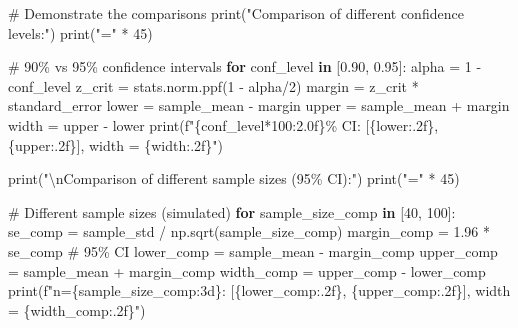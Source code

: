 \documentclass[
  letterpaper,
  DIV=11,
  numbers=noendperiod]{scrartcl}
\newenvironment{Shaded}{\begin{snugshade}}{\end{snugshade}}
\newcommand{\BuiltInTok}[1]{\textcolor[rgb]{0.00,0.23,0.31}{#1}}
\newcommand{\CharTok}[1]{\textcolor[rgb]{0.13,0.47,0.30}{#1}}
\newcommand{\CommentTok}[1]{\textcolor[rgb]{0.37,0.37,0.37}{#1}}
\newcommand{\ControlFlowTok}[1]{\textcolor[rgb]{0.00,0.23,0.31}{\textbf{#1}}}
\newcommand{\DecValTok}[1]{\textcolor[rgb]{0.68,0.00,0.00}{#1}}
\newcommand{\FloatTok}[1]{\textcolor[rgb]{0.68,0.00,0.00}{#1}}
\newcommand{\KeywordTok}[1]{\textcolor[rgb]{0.00,0.23,0.31}{\textbf{#1}}}
\newcommand{\NormalTok}[1]{\textcolor[rgb]{0.00,0.23,0.31}{#1}}
\newcommand{\OperatorTok}[1]{\textcolor[rgb]{0.37,0.37,0.37}{#1}}
\newcommand{\SpecialCharTok}[1]{\textcolor[rgb]{0.37,0.37,0.37}{#1}}
\newcommand{\SpecialStringTok}[1]{\textcolor[rgb]{0.13,0.47,0.30}{#1}}
\newcommand{\StringTok}[1]{\textcolor[rgb]{0.13,0.47,0.30}{#1}}
\begin{document}
\begin{Shaded}
\begin{Highlighting}[]
\CommentTok{\# Demonstrate the comparisons}
\BuiltInTok{print}\NormalTok{(}\StringTok{"Comparison of different confidence levels:"}\NormalTok{)}
\BuiltInTok{print}\NormalTok{(}\StringTok{"="} \OperatorTok{*} \DecValTok{45}\NormalTok{)}

\CommentTok{\# 90\% vs 95\% confidence intervals}
\ControlFlowTok{for}\NormalTok{ conf\_level }\KeywordTok{in}\NormalTok{ [}\FloatTok{0.90}\NormalTok{, }\FloatTok{0.95}\NormalTok{]:}
\NormalTok{    alpha }\OperatorTok{=} \DecValTok{1} \OperatorTok{{-}}\NormalTok{ conf\_level}
\NormalTok{    z\_crit }\OperatorTok{=}\NormalTok{ stats.norm.ppf(}\DecValTok{1} \OperatorTok{{-}}\NormalTok{ alpha}\OperatorTok{/}\DecValTok{2}\NormalTok{)}
\NormalTok{    margin }\OperatorTok{=}\NormalTok{ z\_crit }\OperatorTok{*}\NormalTok{ standard\_error}
\NormalTok{    lower }\OperatorTok{=}\NormalTok{ sample\_mean }\OperatorTok{{-}}\NormalTok{ margin}
\NormalTok{    upper }\OperatorTok{=}\NormalTok{ sample\_mean }\OperatorTok{+}\NormalTok{ margin}
\NormalTok{    width }\OperatorTok{=}\NormalTok{ upper }\OperatorTok{{-}}\NormalTok{ lower}
    \BuiltInTok{print}\NormalTok{(}\SpecialStringTok{f"}\SpecialCharTok{\{}\NormalTok{conf\_level}\OperatorTok{*}\DecValTok{100}\SpecialCharTok{:2.0f\}}\SpecialStringTok{\% CI: [}\SpecialCharTok{\{}\NormalTok{lower}\SpecialCharTok{:.2f\}}\SpecialStringTok{, }\SpecialCharTok{\{}\NormalTok{upper}\SpecialCharTok{:.2f\}}\SpecialStringTok{], width = }\SpecialCharTok{\{}\NormalTok{width}\SpecialCharTok{:.2f\}}\SpecialStringTok{"}\NormalTok{)}

\BuiltInTok{print}\NormalTok{(}\StringTok{"}\CharTok{\textbackslash{}n}\StringTok{Comparison of different sample sizes (95\% CI):"}\NormalTok{)}
\BuiltInTok{print}\NormalTok{(}\StringTok{"="} \OperatorTok{*} \DecValTok{45}\NormalTok{)}

\CommentTok{\# Different sample sizes (simulated)}
\ControlFlowTok{for}\NormalTok{ sample\_size\_comp }\KeywordTok{in}\NormalTok{ [}\DecValTok{40}\NormalTok{, }\DecValTok{100}\NormalTok{]:}
\NormalTok{    se\_comp }\OperatorTok{=}\NormalTok{ sample\_std }\OperatorTok{/}\NormalTok{ np.sqrt(sample\_size\_comp)}
\NormalTok{    margin\_comp }\OperatorTok{=} \FloatTok{1.96} \OperatorTok{*}\NormalTok{ se\_comp  }\CommentTok{\# 95\% CI}
\NormalTok{    lower\_comp }\OperatorTok{=}\NormalTok{ sample\_mean }\OperatorTok{{-}}\NormalTok{ margin\_comp}
\NormalTok{    upper\_comp }\OperatorTok{=}\NormalTok{ sample\_mean }\OperatorTok{+}\NormalTok{ margin\_comp}
\NormalTok{    width\_comp }\OperatorTok{=}\NormalTok{ upper\_comp }\OperatorTok{{-}}\NormalTok{ lower\_comp}
    \BuiltInTok{print}\NormalTok{(}\SpecialStringTok{f"n=}\SpecialCharTok{\{}\NormalTok{sample\_size\_comp}\SpecialCharTok{:3d\}}\SpecialStringTok{: [}\SpecialCharTok{\{}\NormalTok{lower\_comp}\SpecialCharTok{:.2f\}}\SpecialStringTok{, }\SpecialCharTok{\{}\NormalTok{upper\_comp}\SpecialCharTok{:.2f\}}\SpecialStringTok{], width = }\SpecialCharTok{\{}\NormalTok{width\_comp}\SpecialCharTok{:.2f\}}\SpecialStringTok{"}\NormalTok{)}
\end{Highlighting}
\end{Shaded}
\end{document}
